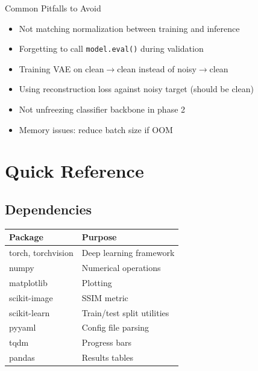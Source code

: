 \documentclass[11pt,a4paper]{article}
\begin{document}
\vspace{0.5cm}

\begin{conceptbox}{Common Pitfalls to Avoid}
\begin{itemize}
    \item Not matching normalization between training and inference
    \item Forgetting to call \texttt{model.eval()} during validation
    \item Training VAE on clean$\rightarrow$clean instead of noisy$\rightarrow$clean
    \item Using reconstruction loss against noisy target (should be clean)
    \item Not unfreezing classifier backbone in phase 2
    \item Memory issues: reduce batch size if OOM
\end{itemize}
\end{conceptbox}

\newpage


\section{Quick Reference}

\subsection{Dependencies}
\begin{center}
\begin{tabular}{@{}ll@{}}
\toprule
\textbf{Package} & \textbf{Purpose} \\
\midrule
torch, torchvision & Deep learning framework \\
numpy & Numerical operations \\
matplotlib & Plotting \\
scikit-image & SSIM metric \\
scikit-learn & Train/test split utilities \\
pyyaml & Config file parsing \\
tqdm & Progress bars \\
pandas & Results tables \\
\bottomrule
\end{tabular}
\end{center}
\end{document}
